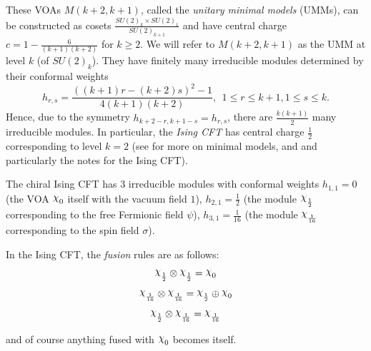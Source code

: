 \documentclass[twoside,11pt,titlepage]{amsart}
\renewcommand{\=}[1]{\stackrel{#1}{=}} %
\theoremstyle{definition}
\theoremstyle{remark}
\DeclareRobustCommand{\rchi}{{\mathpalette\irchi\relax}}
\newcommand{\irchi}[2]{\raisebox{\depth}{$#1\chi$}}
\begin{document}
These VOAs $M(k+2,k+1)$, called the \textit{unitary minimal models} (UMMs), can be constructed as cosets $\frac{SU(2)_k\times SU(2)_1}{SU(2)_{k+1}}$ and have central charge $c=1-\frac{6}{(k+1)(k+2)}$ for $k\ge 2$. We will refer to $M(k+2,k+1)$ as the UMM at level $k$ (of $SU(2)_k$). They have finitely many irreducible modules determined by their conformal weights
$$h_{r,s}=\frac{((k+1)r-(k+2)s)^2-1}{4(k+1)(k+2)}, \ \ 1\le r\le k+1, 1\le s \le k.$$
Hence, due to the symmetry $h_{k+2-r,k+1-s}=h_{r,s}$, there are $\frac{k(k+1)}{2}$ many irreducible modules. In particular, the \textit{Ising CFT} has central charge $\frac{1}{2}$ corresponding to level $k=2$ (see \cite{francesco2012conformal} for more on minimal models, and \cite{francesco2012conformal} and particularly the notes \cite{ginsparg1988applied} for the Ising CFT).

The chiral Ising CFT has $3$ irreducible modules with conformal weights $h_{1,1}=0$ (the VOA $\rchi_0$ itself with the vacuum field $1$), $h_{2,1}=\frac{1}{2}$ (the module $\rchi_\frac{1}{2}$ corresponding to the free Fermionic field $\psi$), $h_{3,1}=\frac{1}{16}$ (the module $\rchi_\frac{1}{16}$ corresponding to the spin field $\sigma$). 

In the Ising CFT, the \textit{fusion} rules are as follows:
$$\rchi_\frac{1}{2} \otimes \rchi_\frac{1}{2} = \rchi_0$$
$$\rchi_\frac{1}{16} \otimes \rchi_\frac{1}{16} = \rchi_\frac{1}{2} \oplus \rchi_0$$
$$\rchi_\frac{1}{2} \otimes \rchi_\frac{1}{16} = \rchi_\frac{1}{16} $$

and of course anything fused with $\rchi_0$ becomes itself. 
\end{document}
